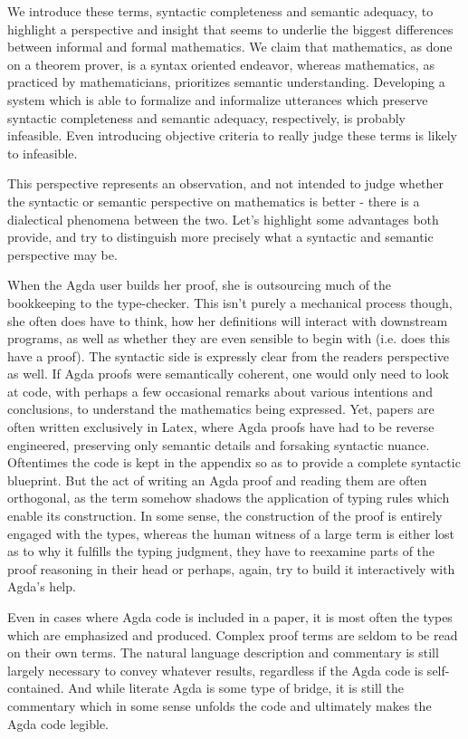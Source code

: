We introduce these terms, syntactic completeness and semantic adequacy, to
highlight a perspective and insight that seems to underlie the biggest
differences between informal and formal mathematics. We claim that mathematics,
as done on a theorem prover, is a syntax oriented endeavor, whereas mathematics,
as practiced by mathematicians, prioritizes semantic understanding. Developing a
system which is able to formalize and informalize utterances which preserve 
syntactic completeness and semantic adequacy, respectively, is
probably infeasible. Even introducing objective criteria to really judge these
terms is likely to infeasible.

This perspective represents an observation, and not intended to judge whether
the syntactic or semantic perspective on mathematics is better - there is a
dialectical phenomena between the two. Let's highlight some advantages both
provide, and try to distinguish more precisely what a syntactic and semantic
perspective may be.

When the Agda user builds her proof, she is outsourcing much of the bookkeeping
to the type-checker. This isn't purely a mechanical process though, she often
does have to think, how her definitions will interact with downstream programs,
as well as whether they are even sensible to begin with (i.e. does this have a
proof). The syntactic side is expressly clear from the readers perspective as
well. If Agda proofs were semantically coherent, one would only need to look at
code, with perhaps a few occasional remarks about various intentions and
conclusions, to understand the mathematics being expressed. Yet, papers are
often written exclusively in Latex, where Agda proofs have had to be reverse
engineered, preserving only semantic details and forsaking syntactic nuance.
Oftentimes the code is kept in the appendix so as to provide a complete
syntactic blueprint. But the act of writing an Agda proof and reading them are
often orthogonal, as the term somehow shadows the application of typing rules
which enable its construction. In some sense, the construction of the proof is
entirely engaged with the types, whereas the human witness of a large term is
either lost as to why it fulfills the typing judgment, they have to reexamine
parts of the proof reasoning in their head or perhaps, again, try to build it
interactively with Agda's help.

Even in cases where Agda code is included in a paper, it is most often the types
which are emphasized and produced. Complex proof terms are seldom to be read on
their own terms. The natural language description and commentary is still
largely necessary to convey whatever results, regardless if the Agda code is
self-contained. And while literate Agda is some type of bridge, it is still the
commentary which in some sense unfolds the code and ultimately makes the Agda
code legible.

